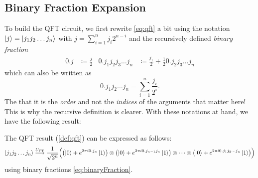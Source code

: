 		\subsection{Binary Fraction Expansion}
			To build the \ac{QFT} circuit, we first rewrite \eqref{eq:qft} a bit using the notation \( \ket{j} = \ket{j_1 j_2 \dots j_n} \) with \( j = \sum_{i = 1}^{n} j_i 2^{n - i} \) and the recursively defined \emph{binary fraction}
			\begin{align}
				0.j &\coloneqq \frac{j}{2} &
				0.j_1 j_2 j_3 \dots j_n &\coloneqq \frac{j_1}{2} + \frac{1}{2} 0.j_2 j_3 \dots j_n
				\label{eq:binaryFraction}
			\end{align}
			which can also be written as
			\begin{equation}
				0.j_1 j_2 \dots j_n = \sum_{i = 1}^{n} \frac{j_i}{2^i}.
			\end{equation}
			The that it is the \emph{order} and not the \emph{indices} of the arguments that matter here! This is why the recursive definition is clearer. With these notations at hand, we have the following result:
			\begin{theorem}
				The \ac{QFT} result (\autoref{def:qft}) can be expressed as follows:
				\begin{equation}
					\ket{j_1 j_2 \dots j_n}
					\overset{U_\mathrm{FT}}{\longrightarrow}
					\frac{1}{\sqrt{2^n}} \Bigl( \bigl( \ket{0} + e^{2 \pi i 0.j_n} \ket{1} \bigr) \otimes \bigl( \ket{0} + e^{2 \pi i 0.j_{n - 1} j_n} \ket{1} \bigr) \otimes \dots \otimes \bigl( \ket{0} + e^{2 \pi i 0.j_1 j_2 \dots j_n} \ket{1} \bigr) \Bigr)
				\end{equation}
				using binary fractions \eqref{eq:binaryFraction}.
			\end{theorem}
